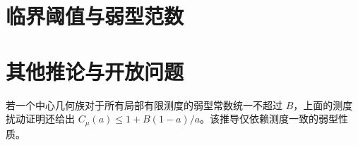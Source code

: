 \documentclass[UTF8,11pt,fontset=none]{ctexart}
\theoremstyle{definition}\newtheorem{theorem}{定理}[section]\newtheorem{lemma}[theorem]{引理}\newtheorem{corollary}[theorem]{推论}\newtheorem{proposition}[theorem]{命题}
\theoremstyle{remark}\newtheorem{remark}[theorem]{说明}
\begin{document}


\section{临界阈值与弱型范数}














\section{其他推论与开放问题}
若一个中心几何族对于所有局部有限测度的弱型常数统一不超过 $B$，上面的测度扰动证明还给出 $C_\mu(a)\le1+B(1-a)/a$。该推导仅依赖测度一致的弱型性质。
\end{document}
